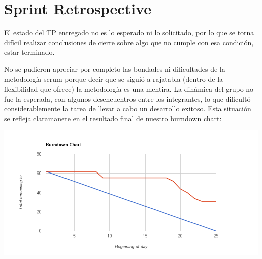 \section{Sprint Retrospective}
El estado del TP entregado no es lo esperado ni lo solicitado, por lo que se torna difícil realizar conclusiones de cierre sobre algo que no cumple con esa condición, estar terminado. 

No se pudieron apreciar por completo las bondades ni dificultades de la metodología scrum porque decir que se siguió a rajatabla (dentro de la flexibilidad que ofrece) la metodología es una mentira. La dinámica del grupo no fue la esperada, con algunos desencuentros entre los integrantes, lo que dificultó considerablemente la tarea de llevar a cabo un desarrollo exitoso.
Esta situación se refleja claramanete en el resultado final de nuestro burndown chart:

\begin{center}
\includegraphics[scale=0.4]{burndown.png} 
\end{center}

